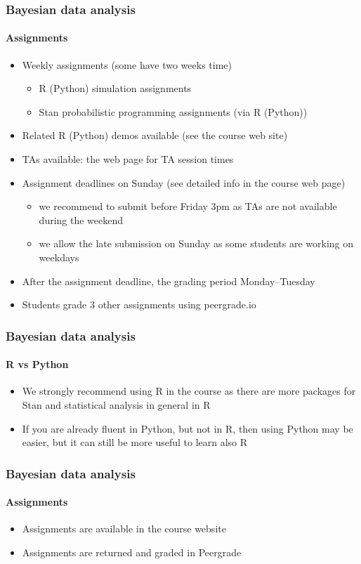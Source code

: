 \documentclass[english,t]{beamer}
\begin{document}
\begin{frame}
  \frametitle{Bayesian data analysis}  %
  \framesubtitle{Assignments}
  \begin{itemize}
  \item Weekly assignments (some have two weeks time)
    \begin{itemize}
    \item R (Python) simulation assignments
    \item Stan probabilistic programming assignments (via R (Python))
    \end{itemize}
  \item Related R (Python) demos available (see the course web site)
  \item TAs available: the web page for TA session times
  \item Assignment deadlines on Sunday (see detailed info in the course web page)
    \begin{itemize}
    \item we recommend to submit before Friday 3pm as TAs are not
      available during the weekend
    \item we allow the late submission on Sunday as some students are
      working on weekdays
    \end{itemize}
  \item After the assignment deadline, the grading period Monday--Tuesday
  \item Students grade 3 other assignments using peergrade.io
  \end{itemize}
  
\end{frame}

\begin{frame}
  \frametitle{Bayesian data analysis}  %
  \framesubtitle{R vs Python}

  \begin{itemize}
  \item We strongly recommend using R in the course as there are more
    packages for Stan and statistical analysis in general in R
  \item If you are already fluent in Python, but not in R, then using Python
    may be easier, but it can still be more useful to learn also R
  \end{itemize}
  
\end{frame}

\begin{frame}
  \frametitle{Bayesian data analysis}  %
  \framesubtitle{Assignments}
  \begin{itemize}
  \item Assignments are available in the course website
  \item Assignments are returned and graded in Peergrade
  \end{itemize}
\end{frame}
\end{document}
